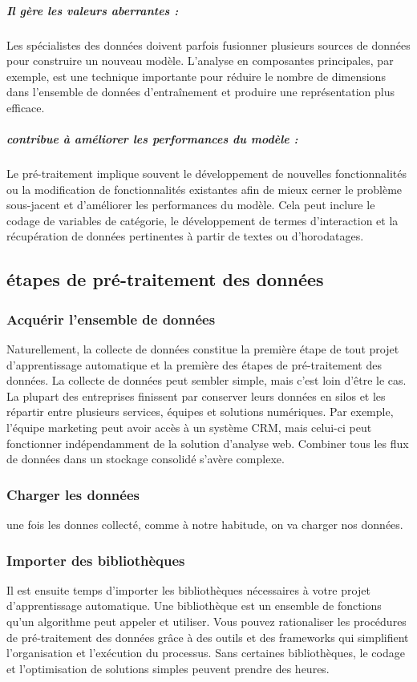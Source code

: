 \documentclass[a4paper, 12pt]{article}
\begin{document}
	\subparagraph{\textbf{Il gère les valeurs aberrantes :}}Les spécialistes des données doivent parfois fusionner plusieurs sources de données pour construire un nouveau modèle. L'analyse en composantes principales, par exemple, est une technique importante pour réduire le nombre de dimensions dans l'ensemble de données d'entraînement et produire une représentation plus efficace.
	\subparagraph{\textbf{contribue à améliorer les performances du modèle :}}Le pré-traitement implique souvent le développement de nouvelles fonctionnalités ou la modification de fonctionnalités existantes afin de mieux cerner le problème sous-jacent et d'améliorer les performances du modèle. Cela peut inclure le codage de variables de catégorie, le développement de termes d'interaction et la récupération de données pertinentes à partir de textes ou d'horodatages.
	\subsection{étapes de pré-traitement des données }
	\subsubsection{Acquérir l'ensemble de données}Naturellement, la collecte de données constitue la première étape de tout projet d'apprentissage automatique et la première des étapes de pré-traitement des données. La collecte de données peut sembler simple, mais c'est loin d'être le cas.
	La plupart des entreprises finissent par conserver leurs données en silos et les répartir entre plusieurs services, équipes et solutions numériques. Par exemple, l'équipe marketing peut avoir accès à un système CRM, mais celui-ci peut fonctionner indépendamment de la solution d'analyse web. Combiner tous les flux de données dans un stockage consolidé s'avère complexe.
	\subsubsection{Charger les données}une fois les donnes collecté, comme à notre habitude, on va charger nos données.
	\subsubsection{Importer des bibliothèques}Il est ensuite temps d'importer les bibliothèques nécessaires à votre projet d'apprentissage automatique. Une bibliothèque est un ensemble de fonctions qu'un algorithme peut appeler et utiliser.
	Vous pouvez rationaliser les procédures de pré-traitement des données grâce à des outils et des frameworks qui simplifient l'organisation et l'exécution du processus. Sans certaines bibliothèques, le codage et l'optimisation de solutions simples peuvent prendre des heures.
\end{document}
